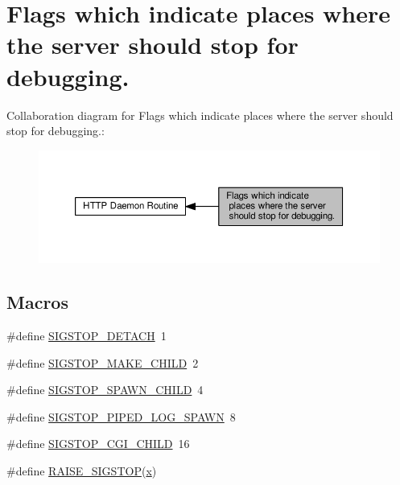 \hypertarget{group__stopsignal}{}\section{Flags which indicate places where the server should stop for debugging.}
\label{group__stopsignal}
Collaboration diagram for Flags which indicate places where the server should stop for debugging.\+:
\nopagebreak
\begin{figure}[H]
\begin{center}
\leavevmode
\includegraphics[width=350pt]{group__stopsignal}
\end{center}
\end{figure}
\subsection*{Macros}
\begin{DoxyCompactItemize}
\item 
\#define \hyperlink{group__stopsignal_ga1a2c74d1d18fd4295b929dbb5f92098c}{S\+I\+G\+S\+T\+O\+P\+\_\+\+D\+E\+T\+A\+CH}~1
\item 
\#define \hyperlink{group__stopsignal_ga0ed356a7ee2a608a8c45ac437d2b970a}{S\+I\+G\+S\+T\+O\+P\+\_\+\+M\+A\+K\+E\+\_\+\+C\+H\+I\+LD}~2
\item 
\#define \hyperlink{group__stopsignal_gad9c91b587b4cd0fa32b1236d0888acc8}{S\+I\+G\+S\+T\+O\+P\+\_\+\+S\+P\+A\+W\+N\+\_\+\+C\+H\+I\+LD}~4
\item 
\#define \hyperlink{group__stopsignal_ga21c726209f8012b7d62c041f41851190}{S\+I\+G\+S\+T\+O\+P\+\_\+\+P\+I\+P\+E\+D\+\_\+\+L\+O\+G\+\_\+\+S\+P\+A\+WN}~8
\item 
\#define \hyperlink{group__stopsignal_ga1f8707320757e1dca0cae9c565d9859c}{S\+I\+G\+S\+T\+O\+P\+\_\+\+C\+G\+I\+\_\+\+C\+H\+I\+LD}~16
\item 
\#define \hyperlink{group__stopsignal_ga65ab9e48a568bd082465da1ab82fcf66}{R\+A\+I\+S\+E\+\_\+\+S\+I\+G\+S\+T\+OP}(\hyperlink{pcregrep_8txt_a4242e9148f20c002763bf4ba53b26ad6}{x})
\end{DoxyCompactItemize}



